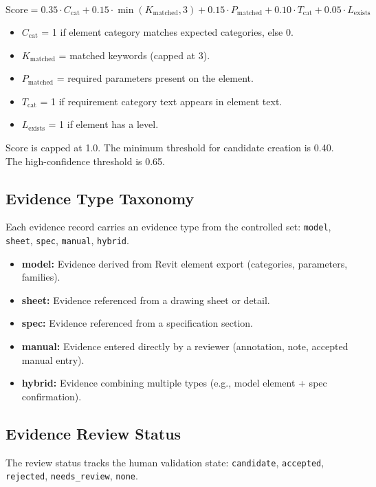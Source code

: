 \documentclass[10pt,letterpaper]{article}
\newcommand{\code}[1]{\texttt{#1}}
\begin{document}
\[
\text{Score} = 0.35 \cdot C_{\text{cat}} + 0.15 \cdot \min(K_{\text{matched}}, 3)
+ 0.15 \cdot P_{\text{matched}} + 0.10 \cdot T_{\text{cat}} + 0.05 \cdot L_{\text{exists}}
\]

\begin{itemize}
  \item $C_{\text{cat}}$ = 1 if element category matches expected categories, else 0.
  \item $K_{\text{matched}}$ = matched keywords (capped at 3).
  \item $P_{\text{matched}}$ = required parameters present on the element.
  \item $T_{\text{cat}}$ = 1 if requirement category text appears in element text.
  \item $L_{\text{exists}}$ = 1 if element has a level.
\end{itemize}

Score is capped at 1.0. The minimum threshold for candidate creation is 0.40. The high-confidence
threshold is 0.65.

\subsection{Evidence Type Taxonomy}

Each evidence record carries an evidence type from the controlled set:
\code{model}, \code{sheet}, \code{spec}, \code{manual}, \code{hybrid}.

\begin{itemize}
  \item \textbf{model:} Evidence derived from Revit element export (categories, parameters,
        families).
  \item \textbf{sheet:} Evidence referenced from a drawing sheet or detail.
  \item \textbf{spec:} Evidence referenced from a specification section.
  \item \textbf{manual:} Evidence entered directly by a reviewer (annotation, note, accepted manual
        entry).
  \item \textbf{hybrid:} Evidence combining multiple types (e.g., model element + spec
        confirmation).
\end{itemize}

\subsection{Evidence Review Status}

The review status tracks the human validation state:
\code{candidate}, \code{accepted}, \code{rejected}, \code{needs\_review}, \code{none}.
\end{document}
